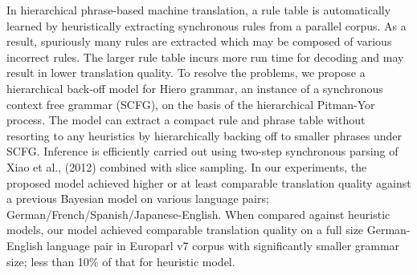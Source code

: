 In hierarchical phrase-based machine translation, a rule table is automatically learned by heuristically extracting synchronous rules from a parallel corpus. As a result, spuriously many rules are extracted which may be composed of various incorrect rules. The larger rule table incurs more run time for decoding and may result in lower translation quality. To resolve the problems, we propose a hierarchical back-off model for Hiero grammar, an instance of a synchronous context free grammar (SCFG), on the basis of the hierarchical Pitman-Yor process. The model can extract a compact rule and phrase table without resorting to any heuristics by hierarchically backing off to smaller phrases under SCFG. Inference is efficiently carried out using two-step synchronous parsing of Xiao et al., (2012) combined with slice sampling. In our experiments, the proposed model achieved higher or at least comparable translation quality against a previous Bayesian model on various language pairs; German/French/Spanish/Japanese-English. When compared against heuristic models, our model achieved comparable translation quality on a full size German-English language pair in Europarl v7 corpus with significantly smaller grammar size; less than 10\% of that for heuristic model.
